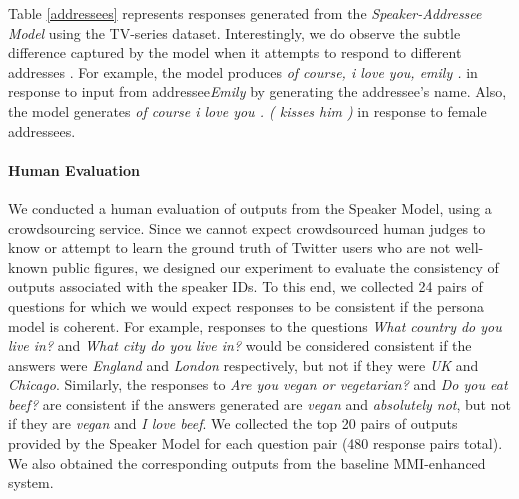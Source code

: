 Table \ref{addressees} represents responses generated from the {\it Speaker-Addressee Model} using the TV-series dataset. Interestingly, we do observe the subtle difference captured by the model when it 
attempts to respond to different 
addresses . For example, the model produces {\it of course, i love you, emily .} in response to input from addressee{\it Emily} by generating the addressee's name. 
Also, the model generates {\it of course i love you . ( kisses him )} in response to female addressees. 
 
\paragraph{Human Evaluation} We conducted a human evaluation of outputs from the Speaker Model, using 
a crowdsourcing service. 
Since we cannot expect crowdsourced human judges to know or attempt to learn the ground truth of Twitter users who are not well-known public figures, we designed our experiment to evaluate the consistency of outputs associated with the speaker IDs. To this end, we collected 24 pairs of questions for which we would expect responses to be consistent if the persona model is coherent.  For example, responses to the questions {\it What country do you live in?} and {\it What city do you live in?} would be considered consistent if the answers were {\it England} and {\it London} respectively, but not if they were {\it UK} and {\it Chicago}.  Similarly, the responses to {\it Are you vegan or vegetarian?} and {\it Do you eat beef?} are consistent if the answers generated are {\it vegan} and {\it absolutely not}, but not if they are {\it vegan} and {\it I love beef}.  We collected the top 20 pairs of outputs provided by the Speaker Model for each question pair (480 response pairs total). We also obtained the corresponding outputs from the baseline MMI-enhanced \sts system. 

